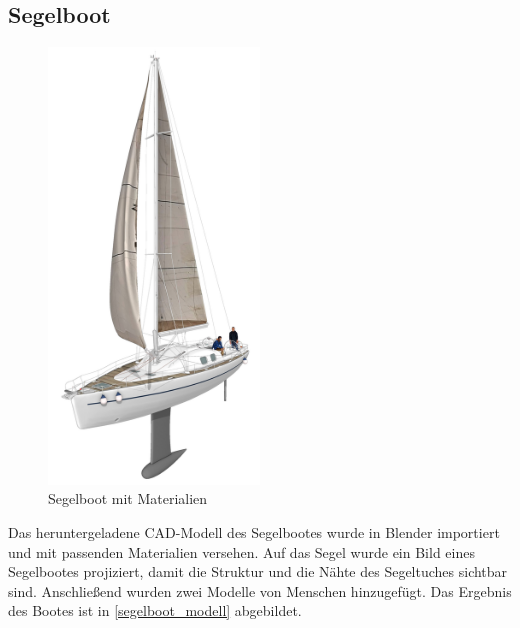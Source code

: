 \subsection{Segelboot}


\begin{figure}[H]
\begin{center}
\includegraphics[width=0.5\textwidth]{gfx/prod/boat/boat.jpg}
\end{center}
\caption{Segelboot mit Materialien}
\label{segelboot_modell}
\end{figure}
\noindent
Das heruntergeladene CAD-Modell  des Segelbootes wurde in Blender importiert und mit passenden Materialien versehen. Auf das Segel wurde ein Bild  eines Segelbootes projiziert, damit die Struktur und die Nähte des Segeltuches sichtbar sind. Anschließend wurden zwei Modelle von Menschen  hinzugefügt. Das Ergebnis des Bootes ist in \autoref{segelboot_modell} abgebildet.

